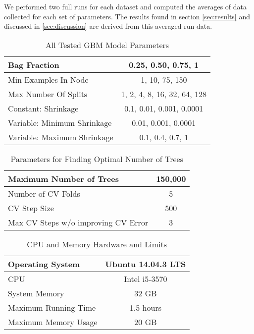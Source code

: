 \documentclass[9pt, conference]{IEEEtran}
\begin{document}
We performed two full runs for each dataset and computed the averages of data collected for each set of parameters. The results found in section \ref{sec:results} and discussed in \ref{sec:discussion} are derived from this averaged run data.

\begin{table}
	\centering
		\begin{tabular}	{ | l | c |}
			\hline
			Bag Fraction & 0.25, 0.50, 0.75, 1 \\ \hline
			Min Examples In Node & 1, 10, 75, 150 \\ \hline
			Max Number Of Splits & 1, 2, 4, 8, 16, 32, 64, 128 \\ \hline
			Constant: Shrinkage & 0.1, 0.01, 0.001, 0.0001 \\ \hline
			Variable: Minimum Shrinkage & 0.01, 0.001, 0.0001 \\ \hline
			Variable: Maximum Shrinkage & 0.1, 0.4, 0.7, 1 \\
			\hline
			
		\end{tabular}
		\caption{All Tested GBM Model Parameters}
		\label{tab:parameters}
\end{table}
\begin{table}
	\centering
	\begin{tabular}{ | l | c |}
		\hline
		\rule{0pt}{2ex}	Maximum Number of Trees & 150,000 \\ \hline
		\rule{0pt}{2ex}	Number of CV Folds & 5 \\ \hline
		\rule{0pt}{2ex}	CV Step Size & 500 \\ \hline
		\rule{0pt}{2ex}	Max CV Steps w/o improving CV Error	& 3 \\ \hline
	\end{tabular}
	\caption{Parameters for Finding Optimal Number of Trees}
	\label{tab:findOptTreeParam}
\end{table}
\begin{table}
	\centering
	\begin{tabular}{ | l | c |}
		\hline
		\rule{0pt}{2ex} Operating System & Ubuntu 14.04.3 LTS \\ \hline
		\rule{0pt}{2ex} CPU & Intel i5-3570 \\ \hline
		\rule{0pt}{2ex} System Memory & 32 GB \\ \hline
		\rule{0pt}{2ex} Maximum Running Time & 1.5 hours \\ \hline
		\rule{0pt}{2ex} Maximum Memory Usage & 20 GB \\ \hline
	\end{tabular}
	\caption{CPU and Memory Hardware and Limits}
	\label{tab:executionLimits}
\end{table}
\end{document}
